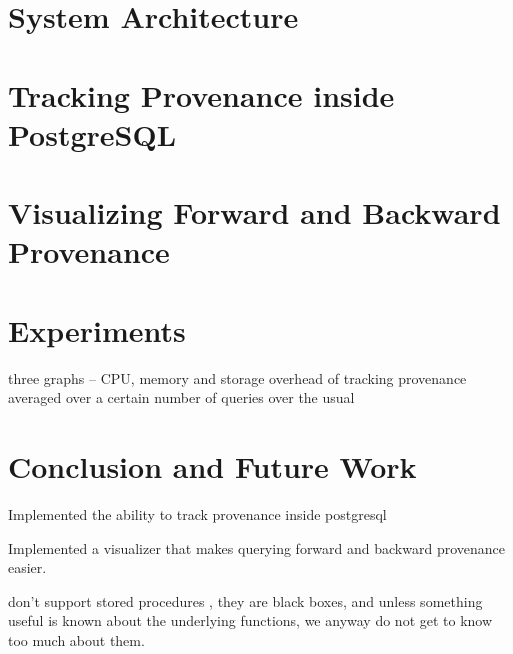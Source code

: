 \documentclass[11pt]{article}
\begin{document}
\section{System Architecture}

\section{Tracking Provenance inside PostgreSQL}

\section{Visualizing Forward and Backward Provenance}

\section{Experiments}

three graphs -- CPU, memory and storage overhead of tracking provenance averaged over a certain number of queries over the usual

\section{Conclusion and Future Work}

Implemented the ability to track provenance inside postgresql

Implemented a visualizer that makes querying forward and backward provenance easier.

don't support stored procedures , they are black boxes, and unless something useful is known about the underlying functions, we anyway do not get to know too much about them.



\end{document}
